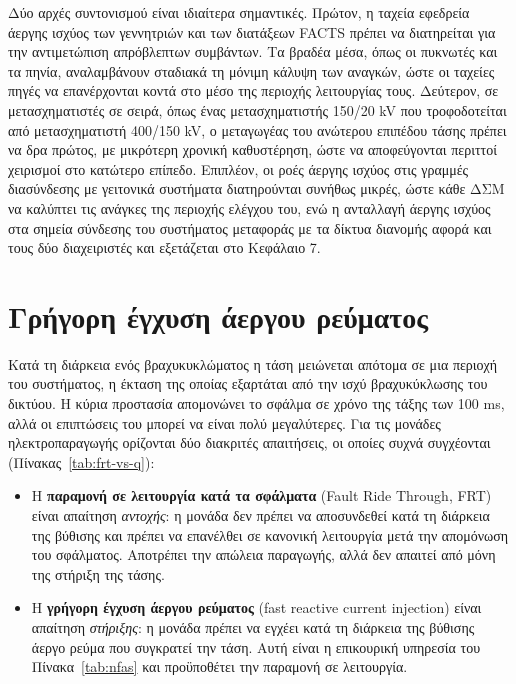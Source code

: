Δύο αρχές συντονισμού είναι ιδιαίτερα σημαντικές. Πρώτον, η ταχεία εφεδρεία άεργης ισχύος των
γεννητριών και των διατάξεων FACTS πρέπει να διατηρείται για την αντιμετώπιση απρόβλεπτων
συμβάντων. Τα βραδέα μέσα, όπως οι πυκνωτές και τα πηνία, αναλαμβάνουν σταδιακά τη μόνιμη
κάλυψη των αναγκών, ώστε οι ταχείες πηγές να επανέρχονται κοντά στο μέσο της περιοχής
λειτουργίας τους. Δεύτερον, σε μετασχηματιστές σε σειρά, όπως ένας μετασχηματιστής 150/20 kV
που τροφοδοτείται από μετασχηματιστή 400/150 kV, ο μεταγωγέας του ανώτερου επιπέδου τάσης πρέπει
να δρα πρώτος, με μικρότερη χρονική καθυστέρηση, ώστε να αποφεύγονται περιττοί χειρισμοί στο
κατώτερο επίπεδο. Επιπλέον, οι ροές άεργης ισχύος στις γραμμές διασύνδεσης με γειτονικά
συστήματα διατηρούνται συνήθως μικρές, ώστε κάθε ΔΣΜ να καλύπτει τις ανάγκες της περιοχής
ελέγχου του, ενώ η ανταλλαγή άεργης ισχύος στα σημεία σύνδεσης του συστήματος μεταφοράς με τα
δίκτυα διανομής αφορά και τους δύο διαχειριστές και εξετάζεται στο Κεφάλαιο 7.

\section{Γρήγορη έγχυση άεργου ρεύματος}
\label{sec:frt}

Κατά τη διάρκεια ενός βραχυκυκλώματος η τάση μειώνεται απότομα σε μια περιοχή του συστήματος,
η έκταση της οποίας εξαρτάται από την ισχύ βραχυκύκλωσης του δικτύου. Η κύρια προστασία
απομονώνει το σφάλμα σε χρόνο της τάξης των 100 ms, αλλά οι επιπτώσεις του μπορεί να είναι
πολύ μεγαλύτερες. Για τις μονάδες ηλεκτροπαραγωγής ορίζονται δύο διακριτές απαιτήσεις, οι
οποίες συχνά συγχέονται (Πίνακας~\ref{tab:frt-vs-q}):

\begin{itemize}
\item Η \textbf{παραμονή σε λειτουργία κατά τα σφάλματα} (Fault Ride Through, FRT) είναι
      απαίτηση \emph{αντοχής}: η μονάδα δεν πρέπει να αποσυνδεθεί κατά τη διάρκεια της
      βύθισης και πρέπει να επανέλθει σε κανονική λειτουργία μετά την απομόνωση του σφάλματος.
      Αποτρέπει την απώλεια παραγωγής, αλλά δεν απαιτεί από μόνη της στήριξη της τάσης.
\item Η \textbf{γρήγορη έγχυση άεργου ρεύματος} (fast reactive current injection) είναι
      απαίτηση \emph{στήριξης}: η μονάδα πρέπει να εγχέει κατά τη διάρκεια της βύθισης άεργο
      ρεύμα που συγκρατεί την τάση. Αυτή είναι η επικουρική υπηρεσία του
      Πίνακα~\ref{tab:nfas} και προϋποθέτει την παραμονή σε λειτουργία.
\end{itemize}

